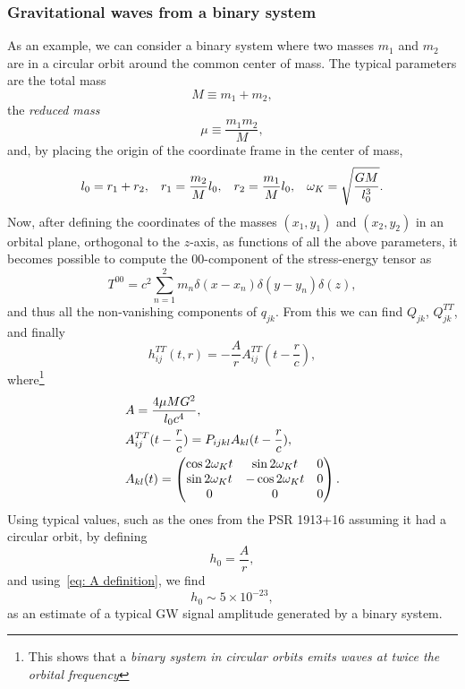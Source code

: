 \subsubsection{Gravitational waves from a binary system}
As an example, we can consider a binary system where two masses $m_1$ and $m_2$ are in a circular orbit around the common center of mass.
The typical parameters are the total mass
\[
    M\equiv m_1+m_2,
\]
the \textit{reduced mass}
\[
    \mu\equiv \frac{m_1m_2}{M},
\]
and, by placing the origin of the coordinate frame in the center of mass, 
\[
    l_0 = r_1+r_2, \hspace{3mm} r_1=\frac{m_2}{M}l_0, \hspace{3mm} r_2=\frac{m_1}{M}l_0, \hspace{3mm} \omega_K=\sqrt{ \frac{GM}{l_0^3}}.
\]
Now, after defining the coordinates of the masses $(x_1,y_1)$ and $(x_2,y_2)$ in an orbital plane, orthogonal to the $z$-axis, as functions of all the above parameters, it becomes possible to compute the 00-component of the stress-energy tensor as
\[
T^{00}=c^2\sum^2_{n=1}m_n\delta(x-x_n)\delta(y-y_n)\delta(z),
\]
and thus all the non-vanishing components of $q_{jk}$.
From this we can find $Q_{jk}$, $Q_{jk}^{TT}$, and finally
\begin{equation}
    h_{ij}^{TT}(t,r) = -\frac{A}{r}A_{ij}^{TT}(t-\frac{r}{c}),
    \label{eq: binary system general strain solution}
\end{equation}
where\footnote{This shows that a \textit{binary system in circular orbits emits waves at twice the orbital frequency}} 
\begin{align}
    & A=\frac{4\mu MG^2}{l_0c^4}, \notag\\
    & A_{ij}^{TT}(t-\frac{r}{c}) = P_{ijkl}A_{kl}(t-\frac{r}{c}),\notag\\ 
    \vspace{2mm}
    &    A_{kl}(t) =  
    \begin{pmatrix}
        \cos{2\omega_K t} & \sin{2\omega_K t} & 0 \\
     \sin{2\omega_K t} &  -\cos{2\omega_K t}& 0 \\
     0 & 0 & 0 \\
    \end{pmatrix}.
    \label{eq: A definition}
\end{align}
Using typical values, such as the ones from the PSR 1913+16 assuming it had a circular orbit, by defining 
\[
    h_0=\frac{A}{r},
\]
and using~\eqref{eq: A definition}, we find  
\begin{equation}
    h_0\sim 5\times10^{-23}, 
    \label{eq: typical strain amplitude value}
\end{equation}
as an estimate of a typical GW signal amplitude generated by a binary system.

